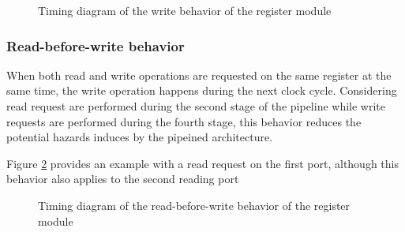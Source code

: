       \begin{figure}[H]
          \centering
          
          \caption{Timing diagram of the write behavior of the register module}
          \label{fig:regm-behavior-write}
        \end{figure}

    \subsubsection{Read-before-write behavior}

      \begin{content}
          When both read and write operations are requested on the same register at the same time, the write operation happens during the next clock cycle. Considering read request are performed during the second stage of the pipeline while write requests are performed during the fourth stage, this behavior reduces the potential hazards induces by the pipeined architecture.

          Figure \ref{fig:regm-behavior-read-before-write} provides an example with a read request on the first port, although this behavior also applies to the second reading port
        \end{content}

      \begin{figure}[H]
          \centering
          
          \caption{Timing diagram of the read-before-write behavior of the register module}
          \label{fig:regm-behavior-read-before-write}
        \end{figure}

\newpage
